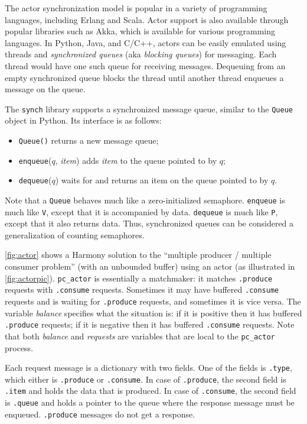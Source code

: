 \documentclass{report}
\begin{document}
The actor synchronization model is popular in a variety of programming
languages, including Erlang and Scala.  Actor support is also available
through popular libraries such as Akka, which is available for various
programming languages.  In Python, Java, and C/C++,
actors can be easily emulated using threads and \emph{synchronized queues}
%
(aka \emph{blocking queues})
%
for messaging.
Each thread would have one such queue for receiving messages.
Dequeuing from an empty synchronized queue blocks the thread until
another thread enqueues a message on the queue.

The \texttt{synch} library supports a synchronized message queue,
similar to the \texttt{Queue} object in Python.
Its interface is as follows:
\begin{itemize}
\item \texttt{Queue()} returns a new message queue;
\item \texttt{enqueue}($q$, \textit{item}) adds \textit{item} to the queue pointed to by $q$;
\item \texttt{dequeue}($q$) waits for and returns an item on the queue pointed to by $q$.
\end{itemize}

Note that a \texttt{Queue} behaves much like a zero-initialized semaphore.
\texttt{enqueue} is much like \texttt{V}, except that it is accompanied by data.
\texttt{dequeue} is much like \texttt{P}, except that it also returns data.
Thus, synchronized queues can be considered a generalization of counting semaphores.

\autoref{fig:actor} shows a Harmony solution to the
``multiple producer / multiple consumer problem'' (with an unbounded buffer)
using an actor (as illustrated in \autoref{fig:actorpic}).
\texttt{pc\_actor} is essentially a matchmaker: it matches
\texttt{.produce} requests with \texttt{.consume} requests.
Sometimes it may have buffered \texttt{.consume} requests and is waiting for
\texttt{.produce} requests, and sometimes it is vice versa.
The variable \textit{balance} specifies what the situation is: if it is positive
then it has buffered \texttt{.produce} requests;
if it is negative
then it has buffered \texttt{.consume} requests.
Note that both \textit{balance} and \textit{requests} are variables that are
local to the \texttt{pc\_actor} process.

Each request message is a dictionary with two fields.  One of the fields is
\texttt{.type}, which either is \texttt{.produce} or \texttt{.consume}.
In case of \texttt{.produce}, the second field is \texttt{.item} and holds
the data that is produced.
In case of \texttt{.consume}, the second field is \texttt{.queue} and holds
a pointer to the queue where the response message must be enqueued.
\texttt{.produce} messages do not get a response.
\end{document}
